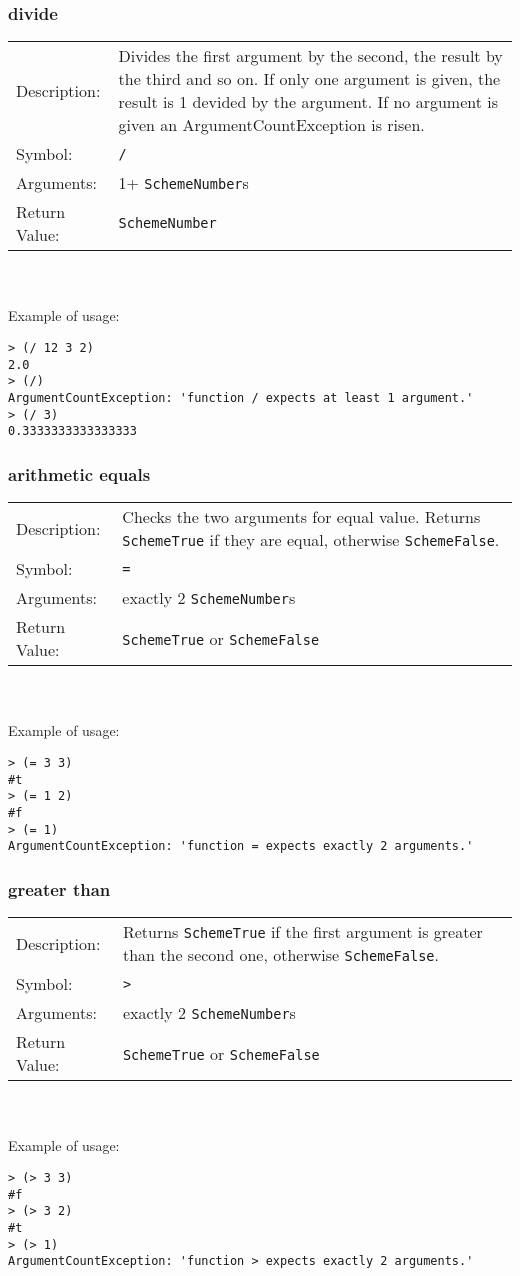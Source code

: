 \documentclass[12pt,a4paper]{scrartcl}
\begin{document}
\subsubsection{divide}
\begin{tabular}{l  p{13cm}}
Description: & Divides the first argument by the second, the result by the third and so on. If only one argument is given, the result is 1 devided by the argument. If no argument is given an ArgumentCountException is risen.\\
Symbol: & \lstinline{/}\\
Arguments: & 1+ \lstinline{SchemeNumber}s\\
Return Value: & \lstinline{SchemeNumber}
\end{tabular}
\\
\\
Example of usage:
\begin{lstlisting}
> (/ 12 3 2)
2.0
> (/)
ArgumentCountException: 'function / expects at least 1 argument.'
> (/ 3)
0.3333333333333333
\end{lstlisting}

\subsubsection{arithmetic equals}
\begin{tabular}{l  p{13cm}}
Description: & Checks the two arguments for equal value. Returns \lstinline{SchemeTrue} if they are equal, otherwise \lstinline{SchemeFalse}. \\
Symbol: & \lstinline{=}\\
Arguments: & exactly 2 \lstinline{SchemeNumber}s\\
Return Value: & \lstinline{SchemeTrue} or \lstinline{SchemeFalse}
\end{tabular}
\\
\\
Example of usage:
\begin{lstlisting}
> (= 3 3)
#t
> (= 1 2)
#f
> (= 1)
ArgumentCountException: 'function = expects exactly 2 arguments.'
\end{lstlisting}


\subsubsection{greater than}
\begin{tabular}{l  p{13cm}}
Description: & Returns \lstinline{SchemeTrue} if the first argument is greater than the second one, otherwise \lstinline{SchemeFalse}. \\
Symbol: & \lstinline{>}\\
Arguments: & exactly 2 \lstinline{SchemeNumber}s\\
Return Value: & \lstinline{SchemeTrue} or \lstinline{SchemeFalse}
\end{tabular}
\\
\\
Example of usage:
\begin{lstlisting}
> (> 3 3)
#f
> (> 3 2)
#t
> (> 1)
ArgumentCountException: 'function > expects exactly 2 arguments.'
\end{lstlisting}
\end{document}
